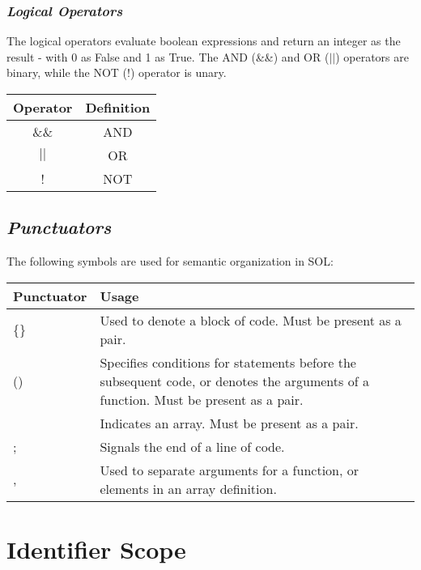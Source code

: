 \documentclass[letterpaper,12pt]{article}
\begin{document}
        \subsubsection{\textit{Logical Operators}}
        The logical operators evaluate boolean expressions and return an integer as the result - with 0 as False and 1 as True. The AND (\&\&) and OR ($||$) operators are binary, while the NOT (!) operator is unary.
	        \begin{center}
	        	\begin{tabular}{ |c|c| }
	        		\hline
	        		\textbf{Operator} & \textbf{Definition} \\
	        		\hline
	        		\&\&  & AND \\
	        		$||$  & OR \\
	        		!  & NOT \\
	        		\hline
	        	\end{tabular}
	        \end{center}

	\subsection{\textit{Punctuators}}
	The following symbols are used for semantic organization in SOL:
	     \begin{center}
	     	\begin{tabular}{ |p{0.25\hsize}|p{0.75\hsize}| }
	     		\hline
	     		\textbf{Punctuator} & \textbf{Usage} \\
	     		\hline
	     		\{\}			& Used to denote a block of code. Must be present as a pair. \\
	     		()				& Specifies conditions for statements before the subsequent code, or denotes the arguments of a function. Must be present as a pair. \\
	     		\lbrack\rbrack	& Indicates an array. Must be present as a pair. \\
	     		;				& Signals the end of a line of code. \\
	     		,				& Used to separate arguments for a function, or elements in an array definition. \\
	     		\hline
	     	\end{tabular}
	     \end{center}
	
\section{Identifier Scope}
\end{document}
